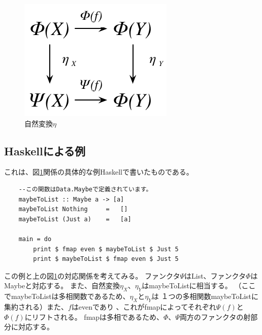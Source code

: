 \newpage

\begin{figure}[htbp]
    \centering
    \includegraphics{diag_nt2.pdf}
    \caption{自然変換$\eta$}
    \label{figNatTrans}
\end{figure}

\subsection{Haskellによる例}
これは、図\ref{figNatTrans}関係の具体的な例Haskellで書いたものである。
\begin{lstlisting}
    --この関数はData.Maybeで定義されています。
    maybeToList :: Maybe a -> [a]
    maybeToList Nothing     =   []
    maybeToList (Just a)    =   [a]

    main = do
        print $ fmap even $ maybeToList $ Just 5
        print $ maybeToList $ fmap even $ Just 5
\end{lstlisting}
この例と上の図\ref{figNatTrans}の対応関係を考えてみる。
ファンクタ$\Psi$はList、ファンクタ$\Phi$はMaybeと対応する。
また、自然変換$\eta_X$、$\eta_Y$はmaybeToListに相当する。
（ここでmaybeToListは多相関数であるため、$\eta_X$と$\eta_Y$は
１つの多相関数maybeToListに集約される）また、$f$はevenであり
、これがfmapによってそれぞれ$\Psi(f)$と$\Phi(f)$にリフトされる。
fmapは多相であるため、$\Phi$、$\Psi$両方のファンクタの射部分に対応する。

